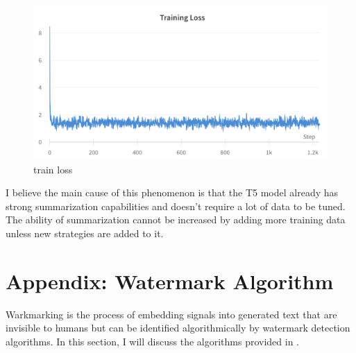 \documentclass{article}
\begin{document}
\begin{figure}[H]
	\centering
	\includegraphics[width=1.0\linewidth]{images/train_loss}
	\caption{train loss}
	\label{fig:trainloss}
\end{figure}

I believe the main cause of this phenomenon is that the T5 model already has strong summarization capabilities and doesn't require a lot of data to be tuned. The ability of summarization cannot be increased by adding more training data unless new strategies are added to it.

\appendix
\section*{Appendix: Watermark Algorithm}
Warkmarking is the process of embedding signals into generated text that are invisible to humans but can be identified algorithmically by watermark detection algorithms.  In this section, I will discuss the algorithms provided in \cite{kirchenbauer2023watermark}.
\end{document}

